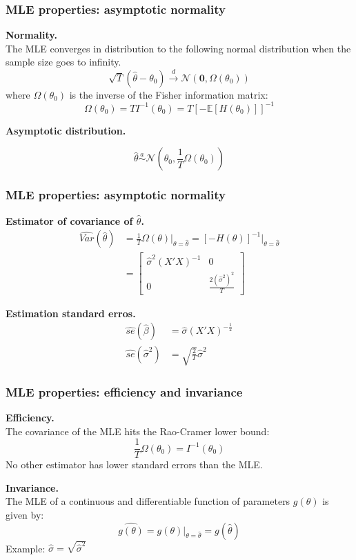 \documentclass[notes,blackandwhite,mathsans]{beamer}
\begin{document}
\begin{frame}
\frametitle{MLE properties: asymptotic normality}

\textbf{Normality.}\\
{\color{mcxs3}The MLE converges in distribution to the following normal distribution when the sample size goes to infinity.}
$$ \sqrt{T}\left(\hat\theta - \theta_0\right) \overset{d}{\rightarrow} \mathcal{N}\left( \mathbf{0}, \Omega(\theta_0) \right) $$
{\color{mcxs3}where} $\Omega(\theta_0)$ {\color{mcxs3}is the inverse of the Fisher information matrix:}
$$\Omega(\theta_0) = TI^{-1}(\theta_0) = T\left[ -\mathbb{E}\left[H(\theta_0)\right] \right]^{-1}$$

\bigskip\textbf{Asymptotic distribution.}

$$ \hat\theta\overset{a}{\sim}\mathcal{N}\left(\theta_0,\frac{1}{T}\Omega(\theta_0)\right) $$


\end{frame}





\begin{frame}
\frametitle{MLE properties: asymptotic normality}

\textbf{Estimator of covariance of $\hat\theta$.}
\begin{align*} 
\widehat{Var}(\hat\theta) &= \frac{1}{T}\Omega(\theta)|_{\theta=\hat\theta} =\left[ -H(\theta) \right]^{-1}\big|_{\theta=\hat\theta}\\
&= \begin{bmatrix} 
\hat\sigma^2(X'X)^{-1} & 0 \\
0 & \frac{2\left(\hat\sigma^2\right)^2}{T}
 \end{bmatrix}
\end{align*} 

\bigskip\textbf{Estimation standard erros.}
\begin{align*} 
\hat{se}\left(\hat\beta\right) &= \hat\sigma(X'X)^{-\frac{1}{2}}\\
\hat{se}\left(\hat\sigma^2\right) &=\sqrt{\frac{2}{T}}\hat\sigma^2
\end{align*} 

\end{frame}





\begin{frame}
\frametitle{MLE properties: efficiency and invariance}

\textbf{Efficiency.}\\
{\color{mcxs3}The covariance of the MLE hits the Rao-Cramer lower bound:}
$$\frac{1}{T}\Omega(\theta_0) =  I^{-1}(\theta_0)$$
{\color{mcxs3}No other estimator has lower standard errors than the MLE.}

\bigskip\textbf{Invariance.}\\
{\color{mcxs3}The MLE of a continuous and differentiable function of parameters} $g(\theta)$ {\color{mcxs3}is given by:}
$$ \widehat{g(\theta)} = g(\theta)|_{\theta=\hat\theta}=g(\hat\theta) $$
{\color{mcxs3}Example:} $\hat\sigma = \sqrt{\hat\sigma^2}$

\end{frame}
\end{document}
